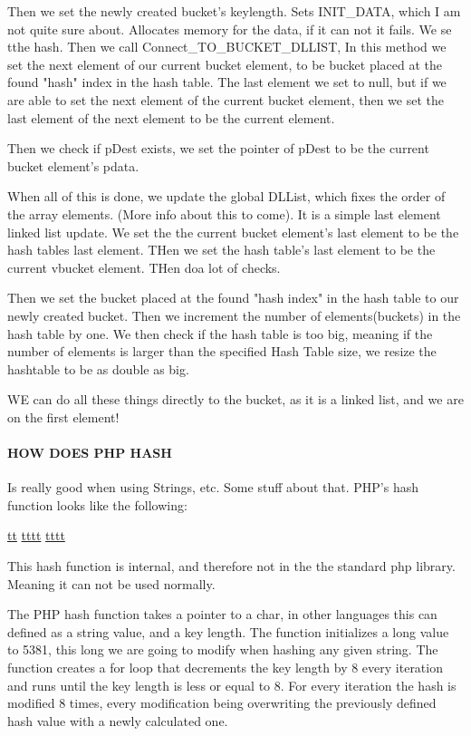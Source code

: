 \documentclass[titlepage]{article}
\begin{document}
	Then we set the newly created bucket's keylength.
	Sets INIT\_DATA, which I am not quite sure about. Allocates memory for the data, if it can not it fails. 
	We se tthe hash.
	Then we call Connect\_TO\_BUCKET\_DLLIST,
	In this method we set the next element of our current bucket element, to be bucket placed at the found "hash" index in the hash table. 
	The last element we set to null, but if we are able to set the next element of the current bucket element, then we set the last element of the next element to be the current element. 
	
	Then we check if pDest exists, we set the pointer of pDest to be the current bucket element's pdata.
	

	
	When all of this is done, we update the global DLList, which fixes the order of the array elements. (More info about this to come). 
	It is a simple last element linked list update. 
	We set the the current bucket element's last element to be the hash tables last element.
	THen we set the hash table's last element to be the current vbucket element.
		THen doa  lot of checks. 
	 
	Then we set the bucket placed at the found "hash index" in the hash table to our newly created bucket.
	Then we increment the number of elements(buckets) in the hash table by one.
	We then check if the hash table is too big, meaning if the number of elements is larger than the specified 
	Hash Table size, we resize the hashtable to be as double as big.
	
	WE can do all these things directly to the bucket, as it is a linked list, and we are on the first element!
	
	
	
	\paragraph{HOW DOES PHP HASH}
	Is really good when using Strings, etc. Some stuff about that. 
	PHP's hash function looks like the following:
	
	
	
	\href{http://lxr.php.net/xref/PHP_5_4/Zend/zend_hash.c#persistent}{tt}
	\href{http://lxr.php.net/xref/PHP_5_4/Zend/zend_hash.h#261}{tttt}
	\href{http://lxr.php.net/xref/PHP_5_4/Zend/zend_hash.c}{tttt}
	
	This hash function is internal, and therefore not in the the standard php library. Meaning it can not be used normally.
	
	The PHP hash function takes a pointer to a char, in other languages this can defined as a string value, and a key length.  
	The function initializes a long value to 5381, this long we are going to modify when hashing any given string. 
	The function creates a for loop that decrements the key length by 8 every iteration and runs until the key length is less or equal to 8. 
	For every iteration the hash is modified 8 times, every modification being overwriting the previously defined hash value with a newly calculated one. 
	
\end{document}
